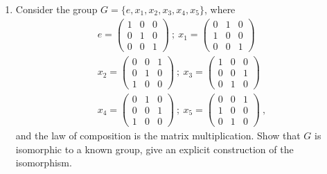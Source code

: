 \documentclass[12pt]{article}
\begin{document}
\begin{enumerate}
\begin{enumerate}
\end{enumerate}

\item Consider the group $G=\{e,x_1,x_2,x_3,x_4,x_5\}$, where
\begin{eqnarray*}
e=\left( \begin{array}{ccc} 1 & 0 & 0 \\ 0 & 1 & 0 \\ 0 & 0 & 1
\end{array}\right) \ ; \
x_1 = \left( \begin{array}{ccc} 0 & 1 & 0 \\ 1 & 0 & 0 \\ 0 & 0 & 1
\end{array}\right) \\
x_2 = \left( \begin{array}{ccc} 0 & 0 & 1 \\ 0 & 1 & 0 \\ 1 & 0 & 0
\end{array}\right) \ ; \
x_3 = \left( \begin{array}{ccc} 1 & 0 & 0 \\ 0 & 0 & 1 \\ 0 & 1 & 0
\end{array}\right) \\
x_4 = \left( \begin{array}{ccc} 0 & 1 & 0 \\ 0 & 0 & 1 \\ 1 & 0 & 0
\end{array}\right) \ ; \
x_5 = \left( \begin{array}{ccc} 0 & 0 & 1 \\ 1 & 0 & 0 \\ 0 & 1 & 0
\end{array}\right) \ ,
\end{eqnarray*}
and the law of composition is the matrix multiplication.
Show that $G$ is isomorphic to a known group, give an explicit
construction of the isomorphism.


\end{enumerate}
\end{document}
